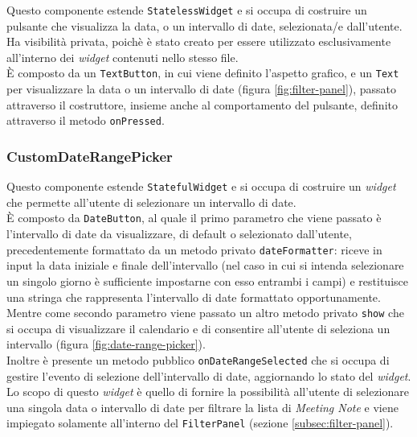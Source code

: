 Questo componente estende \lstinline{StatelessWidget} e si occupa di costruire un pulsante che visualizza la data, o un intervallo di date, selezionata/e dall'utente.\\
Ha visibilità privata, poichè è stato creato per essere utilizzato esclusivamente all'interno dei \emph{widget} contenuti nello stesso file.\\
È composto da un \lstinline{TextButton}\cite{site:text-button}, in cui viene definito l'aspetto grafico, e un \lstinline{Text} per visualizzare la data o un intervallo di date (figura \ref{fig:filter-panel}), passato attraverso il costruttore, insieme anche al comportamento del pulsante, definito attraverso il metodo \lstinline{onPressed}\cite{site:on-pressed}.

\subsubsection*{CustomDateRangePicker}
\label{subsubsec:custom-date-range-picker}

Questo componente estende \lstinline{StatefulWidget} e si occupa di costruire un \emph{widget} che permette all'utente di selezionare un intervallo di date.\\
È composto da \lstinline{DateButton}, al quale il primo parametro che viene passato è l'intervallo di date da visualizzare, di default o selezionato dall'utente, precedentemente formattato da un metodo privato \lstinline{dateFormatter}: riceve in input la data iniziale e finale dell'intervallo (nel caso in cui si intenda selezionare un singolo giorno è sufficiente impostarne con esso entrambi i campi) e restituisce una stringa che rappresenta l'intervallo di date formattato opportunamente.\\
Mentre come secondo parametro viene passato un altro metodo privato \lstinline{show} che si occupa di visualizzare il calendario e di consentire all'utente di seleziona un intervallo (figura \ref{fig:date-range-picker}). \\
Inoltre è presente un metodo pubblico \lstinline{onDateRangeSelected} che si occupa di gestire l'evento di selezione dell'intervallo di date, aggiornando lo stato del \emph{widget}. \\
Lo scopo di questo \emph{widget} è quello di fornire la possibilità all'utente di selezionare una singola data o intervallo di date per filtrare la lista di \emph{Meeting Note} e viene impiegato solamente all'interno del \lstinline{FilterPanel} (sezione \ref{subsec:filter-panel}).

